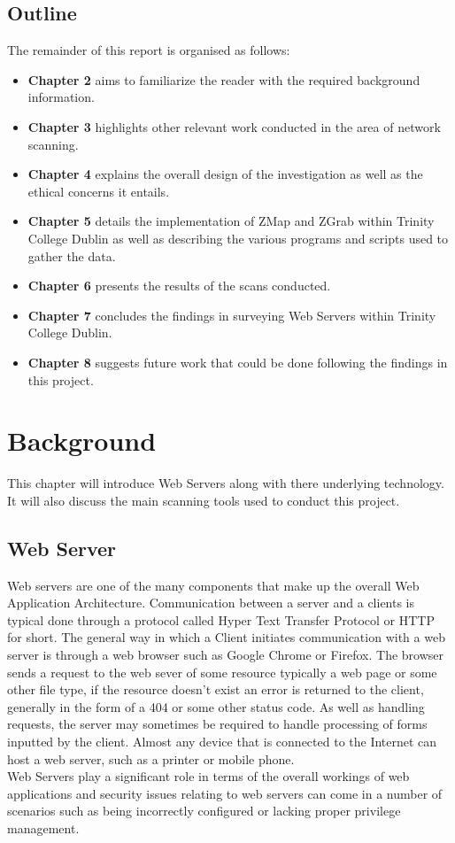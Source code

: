 \documentclass[a4wide,leqno,12pt]{report}
\begin{document}
\section{Outline}
The remainder of this report is organised as follows:\\
\begin{itemize}
\item\textbf{Chapter 2} aims to familiarize the reader with the required background information.
\item\textbf{Chapter 3} highlights other relevant work conducted in the area of network scanning.
\item\textbf{Chapter 4} explains the overall design of the investigation as well as the ethical concerns it entails.
\item\textbf{Chapter 5} details the implementation of ZMap and ZGrab within Trinity College Dublin as well as describing the various programs and scripts used to gather the data.
\item\textbf{Chapter 6} presents the results of the scans conducted.
\item\textbf{Chapter 7} concludes the findings in surveying Web Servers within Trinity College Dublin.
\item\textbf{Chapter 8} suggests future work that could be done following the findings in this project.
\end{itemize}


\chapter{Background}
This chapter will introduce Web Servers along with there underlying technology. It will also discuss the main scanning tools used to conduct this project.
\section{Web Server}
Web servers are one of the many components that make up the overall Web Application Architecture.
Communication between a server and a clients is typical done through a protocol called Hyper Text Transfer Protocol or HTTP for short. The general way in which a Client initiates communication with a web server is through a web browser such as Google Chrome or Firefox. The browser sends a request to the web sever of some resource typically a web page or some other file type, if the resource doesn't exist an error is returned to the client, generally in the form of a 404 or some other status code. As well as handling requests, the server may sometimes be required to handle processing of forms inputted by the client\cite{conallen1999modeling}. Almost any device that is connected to the Internet can host a web server, such as a printer or mobile phone. \\
Web Servers play a significant role in terms of the overall workings of web applications and security issues relating to web servers can come in a number of scenarios such as being incorrectly configured\cite{mendes2008assessing} or lacking proper privilege management.
\end{document}
